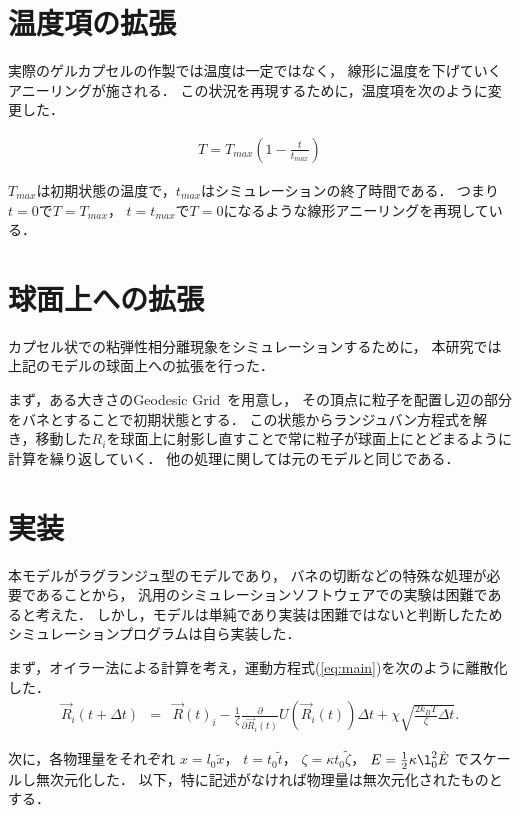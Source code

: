 \section{温度項の拡張}
実際のゲルカプセルの作製では温度は一定ではなく，
線形に温度を下げていくアニーリングが施される．
この状況を再現するために，温度項を次のように変更した．

\begin{eqnarray}
T = T_{max}(1-\frac{t}{t_{max}})
\end{eqnarray}

$T_{max}$は初期状態の温度で，$t_{max}$はシミュレーションの終了時間である．
つまり$t=0$で$T=T_{max}$，
$t=t_{max}$で$T=0$になるような線形アニーリングを再現している．


\section{球面上への拡張}
カプセル状での粘弾性相分離現象をシミュレーションするために，
本研究では上記のモデルの球面上への拡張を行った．

まず，ある大きさのGeodesic Grid~\cite{Geodesic}を用意し，
その頂点に粒子を配置し辺の部分をバネとすることで初期状態とする．
この状態からランジュバン方程式を解き，移動した$R_i$を球面上に射影し直すことで常に粒子が球面上にとどまるように計算を繰り返していく．
他の処理に関しては元のモデルと同じである．




\section{実装}
本モデルがラグランジュ型のモデルであり，
バネの切断などの特殊な処理が必要であることから，
汎用のシミュレーションソフトウェアでの実験は困難であると考えた．
しかし，モデルは単純であり実装は困難ではないと判断したためシミュレーションプログラムは自ら実装した．

まず，オイラー法による計算を考え，運動方程式(\ref{eq:main})を次のように離散化した．
\begin{eqnarray}
    \vec{R}_i(t+\Delta t) &=& 
    \vec{R}(t)_i
    -\frac{1}{\zeta}\frac{\partial}{\partial\vec{R}_i(t)}U(\vec{R}_i(t))\Delta t
    +\chi\sqrt{\frac{2k_B T}{\zeta}\Delta t}
    .
\end{eqnarray}

次に，各物理量をそれぞれ
$x=l_0 \tilde{x}$，
$t=t_0 \tilde{t}$，
$\zeta=\kappa t_0 \tilde{\zeta}$，
$E=\frac{1}{2}\kappa\l_0^2\tilde{E}$
でスケールし無次元化した．
以下，特に記述がなければ物理量は無次元化されたものとする．


